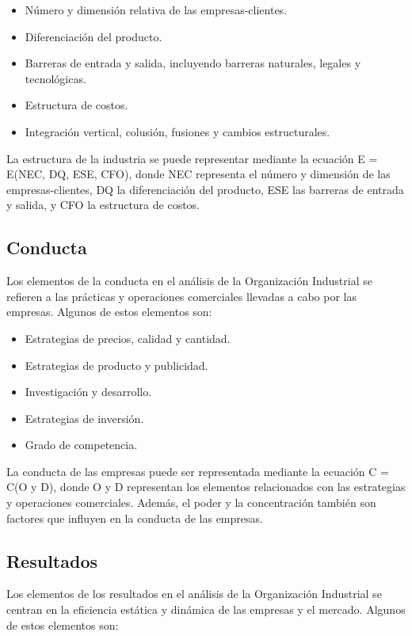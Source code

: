 \documentclass[
  doc,
  floatsintext,
  longtable,
  a4paper,
  nolmodern,
  notxfonts,
  notimes,
  colorlinks=true,linkcolor=blue,citecolor=blue,urlcolor=blue]{apa7}
\providecommand{\tightlist}{%
  \setlength{\itemsep}{0pt}\setlength{\parskip}{0pt}}
\begin{document}
\begin{itemize}
\tightlist
\item
  Número y dimensión relativa de las empresas-clientes.
\item
  Diferenciación del producto.
\item
  Barreras de entrada y salida, incluyendo barreras naturales, legales y
  tecnológicas.
\item
  Estructura de costos.
\item
  Integración vertical, colusión, fusiones y cambios estructurales.
\end{itemize}

La estructura de la industria se puede representar mediante la ecuación
E = E(NEC, DQ, ESE, CFO), donde NEC representa el número y dimensión de
las empresas-clientes, DQ la diferenciación del producto, ESE las
barreras de entrada y salida, y CFO la estructura de costos.

\subsection{Conducta}\label{conducta}

Los elementos de la conducta en el análisis de la Organización
Industrial se refieren a las prácticas y operaciones comerciales
llevadas a cabo por las empresas. Algunos de estos elementos son:

\begin{itemize}
\tightlist
\item
  Estrategias de precios, calidad y cantidad.
\item
  Estrategias de producto y publicidad.
\item
  Investigación y desarrollo.
\item
  Estrategias de inversión.
\item
  Grado de competencia.
\end{itemize}

La conducta de las empresas puede ser representada mediante la ecuación
C = C(O y D), donde O y D representan los elementos relacionados con las
estrategias y operaciones comerciales. Además, el poder y la
concentración también son factores que influyen en la conducta de las
empresas.

\subsection{Resultados}\label{resultados}

Los elementos de los resultados en el análisis de la Organización
Industrial se centran en la eficiencia estática y dinámica de las
empresas y el mercado. Algunos de estos elementos son:
\end{document}
